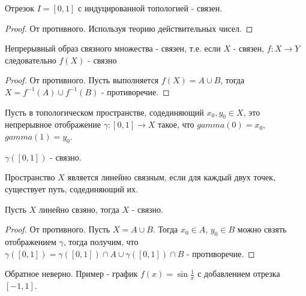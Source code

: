 \begin{theorem}
    Отрезок $I = [0, 1]$ с индуцированной топологией - связен.
\end{theorem}
\begin{proof}
    От противного. Используя теорию действительных чисел. 

\end{proof}

\begin{statement}
    Непрерывный образ связного множества - связен, т.е.
    если $X$ - связен, $f: X \rightarrow Y$ следовательно $f(X)$ - связно
\end{statement}
\begin{proof}
    От противного.
    Пусть выполняется $f(X) = A \cup B$, тогда $X = f^{-1}(A) \cup f^{-1}(B)$ - противоречие.
\end{proof}

\begin{definition}
    Пусть в топологическом пространстве, содединяющий $x_0, y_0 \in X$, это непрерывное отображение $\gamma: [0,1] \rightarrow X$ такое, что $gamma(0) = x_0$, $gamma(1) = y_0$. 
\end{definition}

\begin{nota_bene}
    $\gamma([0, 1])$ - связно.
\end{nota_bene}

\begin{definition}
    Пространство $X$ является линейно связным, если для каждый двух точек, существует путь, содединяющий их.
\end{definition}

\begin{theorem}
    Пусть $X$ линейно свзяно, тогда $X$ - связно.
\end{theorem}
\begin{proof}
    От противного. Пусть $X = A \cup B$. Тогда $x_0 \in A$, $y_0 \in B$ можно свзять отображением $\gamma$, тогда получим, что $\gamma([0, 1]) = \gamma([0, 1]) \cap A \cup \gamma([0, 1]) \cap B$ - противоречие.
\end{proof}

\begin{nota_bene}
    Обратное неверно. Пример - график $f(x) = \sin \frac{1}{x}$ с добавлением отрезка $[-1, 1]$.
\end{nota_bene}